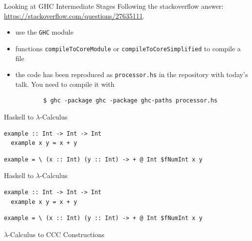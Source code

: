 \documentclass[10pt]{beamer}
\theoremstyle{definition}
\theoremstyle{remark}
\numberwithin{equation}{section}
\begin{document}
\begin{frame}[fragile]{Looking at GHC Intermediate Stages}
  Following the stackoverflow answer: \url{https://stackoverflow.com/questions/27635111}.
  \begin{itemize}
    \item use the \lstinline{GHC} module
    \item functions \lstinline{compileToCoreModule} or \lstinline{compileToCoreSimplified} to compile a file
    \item the code has been reproduced as \lstinline{processor.hs} in the repository with today's talk. You need to compile it with
      \begin{lstlisting}
        $ ghc -package ghc -package ghc-paths processor.hs
      \end{lstlisting}
  \end{itemize}
\end{frame}

\begin{frame}[fragile]{Haskell to $\lambda$-Calculus}
  \begin{lstlisting}[frame=single]
  example :: Int -> Int -> Int
  example x y = x + y
  \end{lstlisting}

  \begin{lstlisting}[frame=single]
  example = \ (x :: Int) (y :: Int) -> + @ Int $fNumInt x y
  \end{lstlisting}
\end{frame}

\begin{frame}[fragile]{Haskell to $\lambda$-Calculus}
  \begin{lstlisting}[frame=single]
  example :: Int -> Int -> Int
  example x y = x + y
  \end{lstlisting}

  \begin{lstlisting}[frame=single]
  example = \ (x :: Int) (y :: Int) -> + @ Int $fNumInt x y
  \end{lstlisting}
\end{frame}

\begin{frame}[fragile]{$\lambda$-Calculus to CCC Constructions}
\end{frame}

\begin{frame}[fragile]{}
\end{frame}

\begin{frame}[fragile]{}
\end{frame}
\end{document}
